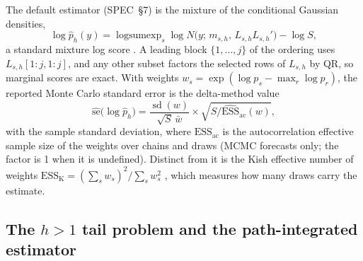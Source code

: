 The default estimator (SPEC~\S7) is the mixture of the conditional Gaussian densities,
\begin{equation}\label{eq:rb-lpd}
  \log\hat p_h(y) = \operatorname{logsumexp}_s \log N\bigl(y;\, m_{s,h},\, L_{s,h}L_{s,h}'\bigr) - \log S ,
\end{equation}
a standard mixture log score \citep{geweke2010comparing,kruger2021predictive}.
A leading block $\{1, \dots, j\}$ of the ordering uses $L_{s,h}[1{:}j, 1{:}j]$, and any other
subset factors the selected rows of $L_{s,h}$ by QR, so marginal scores are exact.
With weights $w_s = \exp(\log p_s - \max_r \log p_r)$, the reported Monte Carlo standard error is
the delta-method value
\begin{equation}\label{eq:mcse}
  \widehat{\mathrm{se}}\bigl(\log\hat p_h\bigr) = \frac{\operatorname{sd}(w)}{\sqrt S\,\bar w}
  \times \sqrt{S/\widehat{\mathrm{ESS}}_{\mathrm{ac}}(w)} ,
\end{equation}
with the sample standard deviation, where $\mathrm{ESS}_{\mathrm{ac}}$ is the autocorrelation
effective sample size of the weights over chains and draws (MCMC forecasts only; the factor is 1
when it is undefined). Distinct from it is the Kish effective number of weights
$\mathrm{ESS}_{\mathrm{K}} = (\sum_s w_s)^2/\sum_s w_s^2$ \citep{kish1965survey}, which measures
how many draws carry the estimate.

\subsection{The \texorpdfstring{$h > 1$}{h > 1} tail problem and the path-integrated estimator}\label{sec:eval-tail}

